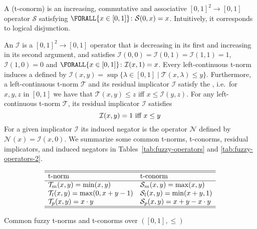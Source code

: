 \documentclass{tlp}
\newcommand{\fneg}[2]{\ensuremath{\mathcal{N}_{#1}(#2)}}
\newcommand{\pretnorm}{\mathcal{T}}
\newcommand{\pretconorm}{\mathcal{S}}
\newcommand{\prefimp}{\mathcal{I}}
\newcommand{\SUCHTHAT}{\colon}
\newcommand{\Forall}[2]{\ensuremath{\FORALL{#1} \SUCHTHAT {#2}}}
\begin{document}
A  (t-conorm) is an increasing, commutative and associative $[0,1]^2 \to [0,1]$ operator $\mathcal{S}$ satisfying $\Forall{x \in [0,1]}{\mathcal{S}(0,x) = x}$. Intuitively, it corresponds to logical disjunction. 

An  $\mathcal{I}$ is a $[0,1]^2 \to [0,1]$ operator that is decreasing in its first and increasing in its second argument, and satisfies $\prefimp(0,0) = \prefimp(0,1) = \prefimp(1,1) = 1$, $\prefimp(1,0) = 0$ and  $\Forall{x \in [0,1]}{\mathcal{I}(x,1) = x}$. Every left-continuous t-norm induces a  defined by $\mathcal{I}(x,y) = \sup \{ \lambda \in [0,1] \mid \mathcal{T}(x,\lambda) \leq y \}$. Furthermore, a left-continuous t-norm $\mathcal{T}$ and its residual implicator $\mathcal{I}$ satisfy the , i.e.~for $x,y,z$ in $[0,1]$ we have that $\mathcal{T}(x,y) \leq z$ iff $x \leq \mathcal{I}(y,z)$. For any left-continuous t-norm $\pretnorm$, its residual implicator $\prefimp$ satisfies
 \begin{equation}
  \prefimp(x,y) = 1 \textnormal{~iff~} x \leq y\label{eq:resfimpprop}
 \end{equation}
For a given implicator $\prefimp$ its induced negator is the operator $\mathcal{N}$ defined by $\fneg{}{x} = \prefimp(x,0)$. We summarize some common t-norms, t-conorms, residual implicators, and induced negators in Tables~\ref{tab:fuzzy-operators} and \ref{tab:fuzzy-operators-2}.

\begin{table}
\[\begin{array}{ll}
\hline
\hline
\textnormal{t-norm} & \textnormal{t-conorm}\\
\hline
\pretnorm_m(x,y) = \min(x,y) & \pretconorm_m(x,y) = \max(x,y) \\
\pretnorm_l(x,y) = \max(0,x+y-1) & \pretconorm_l(x,y) = \min(x+y,1) \\
\pretnorm_p(x,y) = x \cdot y & \pretconorm_p(x,y) = x + y - x \cdot y \\
\hline
\hline
\end{array}\]
\caption{Common fuzzy t-norms and t-conorms over $([0,1],\leq)$}
\label{tab:fuzzy-operators}
\end{table}
\end{document}

